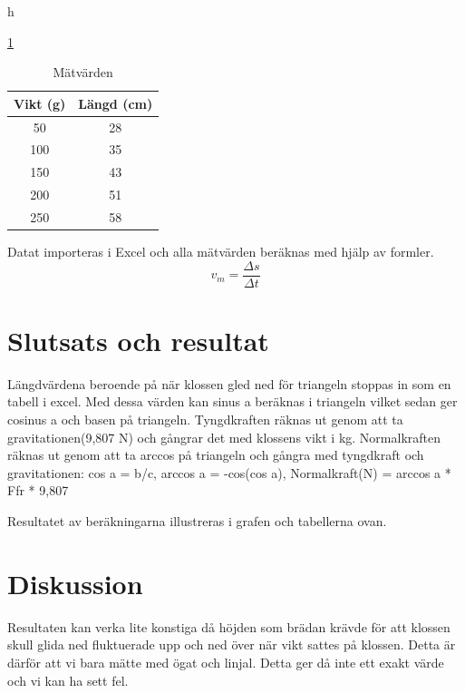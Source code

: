 h\documentclass[11p, titlepage, oneside, a4paper]{article}
\begin{document}
        \ref{table:result2}

        \begin{table}
            \begin{center}
                \begin{tabular}{ |c|c| }
                    \hline
                    Vikt (g) & Längd (cm)  \\
                    \hline
                    50 & 28 \\
                    100 & 35 \\
                    150 & 43 \\
                    200 & 51 \\
                    250 & 58 \\

                    \hline
                \end{tabular}
                \caption{Mätvärden}
                \label{table:result2}
            \end{center}

                \end{table}





    Datat importeras i Excel och alla mätvärden beräknas med hjälp av formler.
    \begin{equation}
        v_m = \frac{\Delta s}{\Delta t}
    \end{equation}
    
    \section{Slutsats och resultat}
        Längdvärdena beroende på när klossen gled ned för triangeln stoppas in som en tabell i excel.
        Med dessa värden kan sinus a beräknas i triangeln vilket sedan ger cosinus a och basen på triangeln.
        Tyngdkraften räknas ut genom att ta gravitationen(9,807 N) och gångrar det med klossens vikt i kg. Normalkraften
        räknas ut genom att ta arccos på triangeln och gångra med tyngdkraft och gravitationen:
        cos a = b/c, arccos a = -cos(cos a),
        Normalkraft(N) = arccos a * Ffr * 9,807


        Resultatet av beräkningarna illustreras i grafen och tabellerna ovan.
    \section{Diskussion} 
    Resultaten kan verka lite konstiga då höjden som brädan krävde för att klossen skull glida ned
    fluktuerade upp och ned över när vikt sattes på klossen. Detta är därför att vi bara mätte med ögat och linjal.
    Detta ger då inte ett exakt värde och vi kan ha sett fel.

    
    \printbibliography
\end{document}
